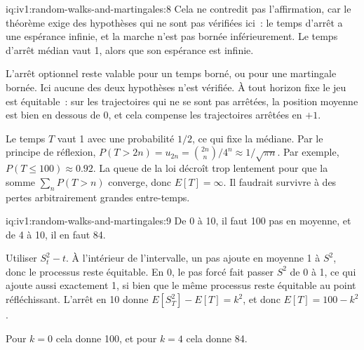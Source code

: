 \begin{solution}{iq:iv1:random-walks-and-martingales:8}
Cela ne contredit pas l'affirmation, car le théorème exige des hypothèses qui ne sont pas vérifiées ici~: le temps d'arrêt a une espérance infinie, et la marche n'est pas bornée inférieurement. Le temps d'arrêt médian vaut 1, alors que son espérance est infinie.

L'arrêt optionnel reste valable pour un temps borné, ou pour une martingale bornée. Ici aucune des deux hypothèses n'est vérifiée. À tout horizon fixe le jeu est équitable~: sur les trajectoires qui ne se sont pas arrêtées, la position moyenne est bien en dessous de 0, et cela compense les trajectoires arrêtées en $+1$.

Le temps $T$ vaut 1 avec une probabilité $1/2$, ce qui fixe la médiane. Par le principe de réflexion, $P(T > 2n) = u_{2n} = \binom{2n}{n}/4^n \approx 1/\sqrt{\pi n}$. Par exemple, $P(T \le 100) \approx 0.92$. La queue de la loi décroît trop lentement pour que la somme $\sum_n P(T > n)$ converge, donc $E[T] = \infty$. Il faudrait survivre à des pertes arbitrairement grandes entre-temps.

\end{solution}

\begin{solution}{iq:iv1:random-walks-and-martingales:9}
De 0 à 10, il faut 100 pas en moyenne, et de 4 à 10, il en faut 84.

Utiliser $S_t^2 - t$. À l'intérieur de l'intervalle, un pas ajoute en moyenne 1 à $S^2$, donc le processus reste équitable. En 0, le pas forcé fait passer $S^2$ de 0 à 1, ce qui ajoute aussi exactement 1, si bien que le même processus reste équitable au point réfléchissant. L'arrêt en 10 donne $E[S_T^2] - E[T] = k^2$, et donc $E[T] = 100 - k^2$.

Pour $k = 0$ cela donne 100, et pour $k = 4$ cela donne 84.

\end{solution}

